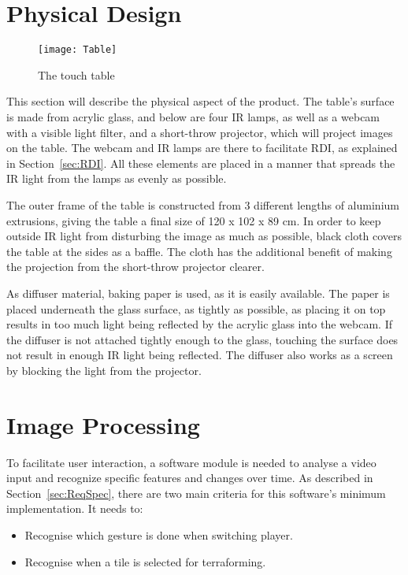 \section{Physical Design} 
\begin{figure} [!h]
\centering \texttt{[image: Table]}
 \caption{The touch table \label{Fig:Table}}
\end{figure}
This section will describe the physical aspect of the product.
The table's surface is made from acrylic glass, and below are four IR lamps, as well as a webcam with a visible light filter, and a short-throw projector, which will project images on the table. The webcam and IR lamps are there to facilitate RDI, as explained in Section~\ref{sec:RDI}. All these elements are placed in a manner that spreads the IR light from the lamps as evenly as possible.

The outer frame of the table is constructed from 3 different lengths of aluminium extrusions, giving the table a final size of 120 x 102 x 89 cm.
In order to keep outside IR light from disturbing the image as much as possible, black cloth covers the table at the sides as a baffle. The cloth has the additional benefit of making the projection from the short-throw projector clearer. 

As diffuser material, baking paper is used, as it is easily available. The paper is placed underneath the glass surface, as tightly as possible, as placing it on top results in too much light being reflected by the acrylic glass into the webcam. If the diffuser is not attached tightly enough to the glass, touching the surface does not result in enough IR light being reflected. The diffuser also works as a screen by blocking the light from the projector. 

\section{Image Processing}
To facilitate user interaction, a software module is needed to analyse a video input and recognize specific features and changes over time. As described in Section~\ref{sec:ReqSpec}, there are two main criteria for this software's minimum implementation. It needs to:
\begin{itemize}
\item Recognise which gesture is done when switching player.
\item Recognise when a tile is selected for terraforming.
\end{itemize}

